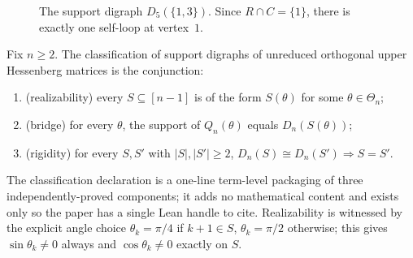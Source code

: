 \begin{figure}[htbp]
\centering
{}
\caption{The support digraph $D_5(\{1,3\})$. Since $R \cap C = \{1\}$, there
is exactly one self-loop at vertex~$1$.}
\label{fig:D5S13}
\end{figure}
\FloatBarrier

\begin{theorem}[Classification]\label{thm:classification}
Fix $n \ge 2$. The classification of support digraphs of unreduced
orthogonal upper Hessenberg matrices is the conjunction:
\begin{enumerate}[label=\textup{(\arabic*)}]
\item \textup{(realizability)} every $S \subseteq [n-1]$ is of the form
  $S(\theta)$ for some $\theta \in \Theta_n$;
\item \textup{(bridge)} for every $\theta$, the support of $Q_n(\theta)$
  equals $D_n(S(\theta))$;
\item \textup{(rigidity)} for every $S, S'$ with $|S|, |S'| \ge 2$,
  $D_n(S) \cong D_n(S') \Rightarrow S = S'$.
\end{enumerate}
\end{theorem}

The classification declaration is a one-line term-level packaging of three
independently-proved components; it adds no mathematical content and exists
only so the paper has a single Lean handle to cite. Realizability is
witnessed by the explicit angle choice $\theta_k = \pi/4$ if $k+1 \in S$,
$\theta_k = \pi/2$ otherwise; this gives $\sin \theta_k \ne 0$ always and
$\cos\theta_k \ne 0$ exactly on $S$.


